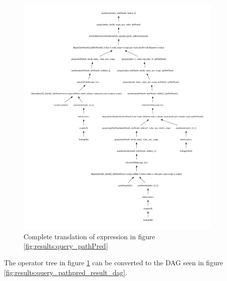 \newpage
\begin{figure}[!htp]
\begin{center}
  \includegraphics[width=0.9\textwidth]{img/graphs/TD_patExprPred}
  \caption{Complete translation of expression in figure
  \ref{fig:results:query_pathPred}}
  \label{fig:results:query_pathpred_result}
\end{center}
\end{figure}

The operator tree in figure \ref{fig:results:query_pathpred_result} can be
converted to the DAG seen in figure \ref{fig:results:query_pathpred_result_dag}.

